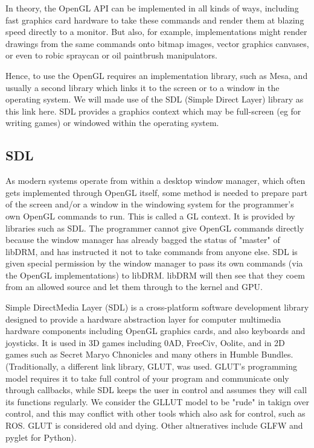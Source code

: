 \documentclass[oneside,english]{scrbook}
\begin{document}
In theory, the OpenGL API can be implemented in all kinds of ways, including fast graphics card hardware to take these commands and render them at blazing speed directly to a monitor. But also, for example, implementations might render drawings from the same commands onto bitmap images, vector graphics canvases, or even to robic spraycan or oil paintbrush manipulators.

Hence, to use the OpenGL requires an implementation library, such as Mesa, and usually a second library which links it to the screen or to a window in the operating system.   We will made use of the SDL (Simple Direct Layer) library as this link here.   SDL provides a graphics context which may be full-screen (eg for writing games) or windowed within the operating system.   


\subsection{SDL}

As modern systems operate from within a desktop window manager, which often gets implemented through OpenGL itself, some method is needed to prepare part of the screen and/or a window in the windowing system for the programmer's own OpenGL commands to run.  This is called a GL context.  It is provided by libraries such as SDL.   The programmer cannot give OpenGL commands directly because the window manager has already bagged the status of "master" of libDRM, and has instructed it not to take commands from anyone else.  SDL is given special permission by the window manager to pass its own commands (via the OpenGL implementations) to libDRM.  libDRM will then see that they coem from an allowed source and let them through to the kernel and GPU.

Simple DirectMedia Layer (SDL) is a cross-platform software development library designed to provide a hardware abstraction layer for computer multimedia hardware components including OpenGL graphics cards, and also keyboards and joysticks.  It is used in 3D games including 0AD, FreeCiv, Oolite, and in 2D games such as Secret Maryo Chnonicles and many others in Humble Bundles.  (Traditionally, a different link library, GLUT, was used. GLUT's programming model requires it to take full control of your program and communicate only through callbacks, while SDL keeps the user in control and assumes they will call its functions regularly. We consider the GLLUT model to be "rude" in takign over control, and this may conflict with other tools which also ask for control, such as ROS.  GLUT is considered old and dying.  Other altneratives include GLFW and pyglet for Python).
\end{document}
